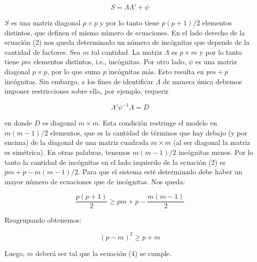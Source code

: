 \documentclass[a4paper,10pt]{article}
\begin{document}
\begin{equation}
 S = \Lambda\Lambda' + \psi
\end{equation}

$S$ es una matriz diagonal $p\times p$ y por lo tanto tiene $p(p+1)/2$ elementos distintos, que definen el mismo número de ecuaciones. En el lado derecho
de la ecuación (2) nos queda determinado un número de incógnitas que depende de la cantidad de factores. Sea $m$ tal cantidad. La matriz $\Lambda$ es 
$p\times m$ y por lo tanto tiene $pm$ elementos distintos, i.e., incógnitas. Por otro lado, $\psi$ es una matriz diagonal $p\times p$, por lo que suma
$p$ incógnitas más. Esto resulta en $pm + p$ incógnitas. Sin embargo, a los fines de identificar $\Lambda$ de manera única debemos imponer restricciones
sobre ella, por ejemplo, requerir 

\begin{equation*}
 \Lambda' \psi^{-1} \Lambda = D
\end{equation*}

en donde $D$ es diagonal $m\times m$.
Esta condición restringe el modelo en $m(m-1)/2$ elementos, que es la cantidad de términos que hay debajo (y por encima) de la diagonal de una matriz 
cuadrada $m \times m$ (al ser diagonal la matriz es simétrica). En otras palabras, tenemos $m(m-1)/2$ incógnitas menos. 
Por lo tanto la cantidad de incógnitas en el lado izquierdo
de la ecuación (2) es $pm + p - m(m-1)/2$. Para que el sistema esté determinado debe haber un mayor número de ecuaciones que de incógnitas.
Nos queda:

\begin{equation}
 \frac{p(p+1)}{2} \geq pm + p - \frac{m(m-1)}{2}
\end{equation}

Reagrupando obtenemos:

\begin{equation}
 (p - m)^2 \geq p + m
\end{equation}

Luego, $m$ deberá ser tal que la ecuación (4) se cumple.
\end{document}
